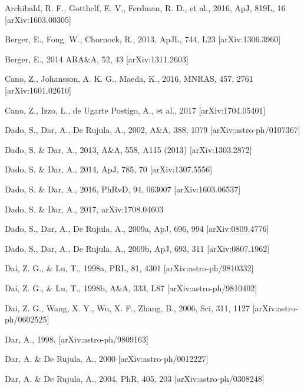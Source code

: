 \documentclass[twocolumn]{aastex61}
\begin{document}
\begin{references}

Archibald, R. F., Gotthelf, E. V., Ferdman, R. D., et al., 2016, ApJ, 819L, 16
[arXiv:1603.00305]

Berger, E., Fong, W.,  Chornock, R., 2013, ApJL, 744, L23 [arXiv:1306.3960]

Berger, E., 2014  ARA\&A, 52, 43 [arXiv:1311.2603]

Cano, Z., Johansson, A. K. G.,  Maeda, K., 2016, MNRAS, 457, 2761 [arXiv:1601.02610]

Cano, Z., Izzo, L., de Ugarte Postigo, A., et al., 2017 [arXiv:1704.05401]

Dado, S., Dar, A., De Rujula, A., 2002, A\&A, 388, 1079 [arXiv:astro-ph/0107367] 

Dado, S. \& Dar, A., 2013, A\&A, 558, A115 (2013) [arXiv:1303.2872]

Dado, S. \& Dar, A., 2014, ApJ, 785, 70 [arXiv:1307.5556]	

Dado, S. \& Dar, A., 2016, PhRvD, 94, 063007 [arXiv:1603.06537]

Dado, S. \& Dar, A., 2017, arXiv:1708.04603

Dado, S., Dar, A., De Rujula, A., 2009a, ApJ, 696, 994 [arXiv:0809.4776] 

Dado, S., Dar, A., De Rujula, A., 2009b, ApJ, 693, 311 [arXiv:0807.1962]

Dai, Z. G., \&  Lu, T., 1998a, PRL, 81, 4301 [arXiv:astro-ph/9810332]

Dai, Z. G., \& Lu, T., 1998b, A\&A, 333, L87 [arXiv:astro-ph/9810402]

Dai, Z. G., Wang, X. Y., Wu, X. F., Zhang, B., 2006, Sci, 311, 1127
[arXiv:astro-ph/0602525]	

Dar, A., 1998, [arXiv:astro-ph/9809163]

Dar, A. \& De Rujula, A., 2000 [arXiv:astro-ph/0012227]

Dar, A. \& De Rujula, A., 2004, PhR, 405, 203 [arXiv:astro-ph/0308248]


\end{references}
\end{document}
